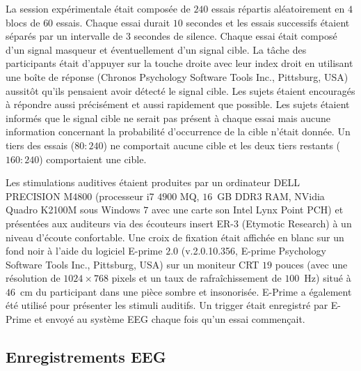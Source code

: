 La session expérimentale était composée de $240$ essais répartis aléatoirement en $4$ blocs de $60$ essais. 
Chaque essai durait $10$ secondes et les essais successifs étaient séparés par un intervalle de $3$ secondes de silence. 
Chaque essai était composé d'un signal masqueur et éventuellement d'un signal cible. 
La tâche des participants était d'appuyer sur la touche droite avec leur index droit en utilisant une boîte de réponse (Chronos Psychology Software Tools Inc., Pittsburg, USA) aussitôt qu'ils pensaient avoir détecté le signal cible. 
Les sujets étaient encouragés à répondre aussi précisément et aussi rapidement que possible. 
Les sujets étaient informés que le signal cible ne serait pas présent à chaque essai mais aucune information concernant la probabilité d'occurrence de la cible n'était donnée. 
Un tiers des essais ($80:240$) ne comportait aucune cible et les deux tiers restants ($160:240$) comportaient une cible. 

Les stimulations auditives étaient produites par un ordinateur DELL PRECISION M4800 (processeur i7 $4900$ MQ, $16$~GB DDR3 RAM, NVidia Quadro K2100M sous Windows $7$ avec une carte son Intel Lynx Point PCH) et présentées aux auditeurs via des écouteurs insert ER-3 (Etymotic Research) à un niveau d'écoute confortable. 
Une croix de fixation était affichée en blanc sur un fond noir à l'aide du logiciel E-prime $2.0$ (v.2.0.10.356, E-prime Psychology Software Tools Inc., Pittsburg, USA) sur un moniteur CRT $19$ pouces (avec une résolution de $1024 \times 768$ pixels et un taux de rafraîchissement de $100$~Hz) situé à $46$~cm du participant dans une pièce sombre et insonorisée. 
E-Prime a également été utilisé pour présenter les stimuli auditifs. 
Un trigger était enregistré par E-Prime et envoyé au système EEG chaque fois qu'un essai commençait. 

\subsection{Enregistrements EEG}
\label{etude2enregistrementsEEG}

